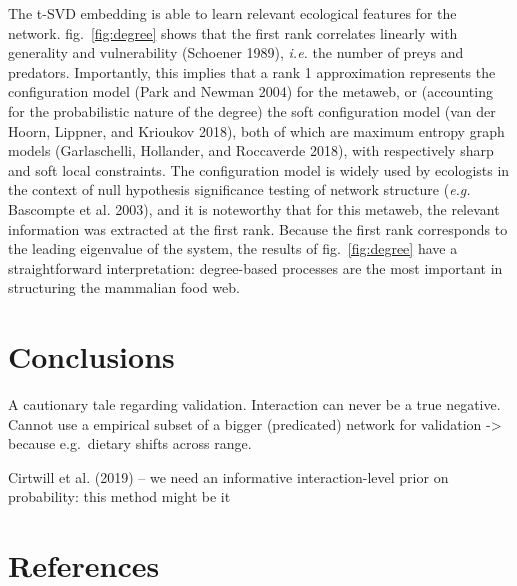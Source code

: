 \documentclass[10pt,oneside]{article}
\begin{document}
The t-SVD embedding is able to learn relevant ecological features for
the network. fig.~\ref{fig:degree} shows that the first rank correlates
linearly with generality and vulnerability (Schoener 1989), \emph{i.e.}
the number of preys and predators. Importantly, this implies that a rank
1 approximation represents the configuration model (Park and Newman
2004) for the metaweb, or (accounting for the probabilistic nature of
the degree) the soft configuration model (van der Hoorn, Lippner, and
Krioukov 2018), both of which are maximum entropy graph models
(Garlaschelli, Hollander, and Roccaverde 2018), with respectively sharp
and soft local constraints. The configuration model is widely used by
ecologists in the context of null hypothesis significance testing of
network structure (\emph{e.g.} Bascompte et al. 2003), and it is
noteworthy that for this metaweb, the relevant information was extracted
at the first rank. Because the first rank corresponds to the leading
eigenvalue of the system, the results of fig.~\ref{fig:degree} have a
straightforward interpretation: degree-based processes are the most
important in structuring the mammalian food web.

\hypertarget{conclusions}{%
\section{Conclusions}\label{conclusions}}

A cautionary tale regarding validation. Interaction can never be a true
negative. Cannot use a empirical subset of a bigger (predicated) network
for validation -\textgreater{} because e.g.~dietary shifts across range.

Cirtwill et al. (2019) -- we need an informative interaction-level prior
on probability: this method might be it

\hypertarget{references}{%
\section*{References}\label{references}}
\end{document}
